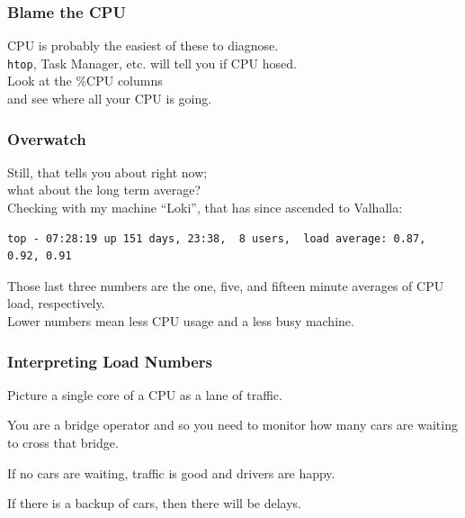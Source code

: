 \begin{frame}
\frametitle{Blame the CPU}


\begin{changemargin}{1cm}
CPU is probably the easiest of these to diagnose. \\[1em]
\texttt{htop}, Task Manager, etc. will tell you if CPU hosed.\\
Look at the \%CPU columns\\
and see where all your CPU is going. 
\end{changemargin}


\end{frame}



\begin{frame}[fragile]
\frametitle{Overwatch}


\begin{changemargin}{1cm}
Still, that tells you about right now; \\
what about the long term average? \\[1em]

Checking with my machine ``Loki'', that has since ascended to Valhalla:\\[1em]

{\scriptsize
\begin{verbatim}
top - 07:28:19 up 151 days, 23:38,  8 users,  load average: 0.87, 0.92, 0.91
\end{verbatim}
}

Those last three numbers are the one, five, and fifteen minute averages of CPU load, respectively. \\[1em]

Lower numbers mean less CPU usage and a less busy machine. 
\end{changemargin}

\end{frame}




\begin{frame}
\frametitle{Interpreting Load Numbers}


\begin{changemargin}{1cm}
Picture a single core of a CPU as a lane of traffic. 

You are a bridge operator and so you need to monitor how many cars are waiting to cross that bridge. 

If no cars are waiting, traffic is good and drivers are happy. 

If there is a backup of cars, then there will be delays.
\end{changemargin}

\end{frame}



